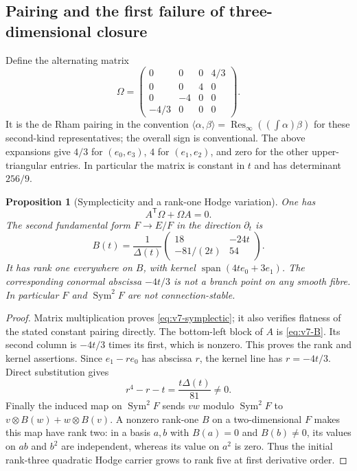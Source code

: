 \documentclass[11pt]{article}
\newtheorem{proposition}[proposition]{Proposition}
\theoremstyle{definition}
\theoremstyle{remark}
\newcommand{\Span}{\operatorname{span}}
\begin{document}
\subsection{Pairing and the first failure of three-dimensional closure}
Define the alternating matrix
\begin{equation}
 \Omega=
 \begin{pmatrix}
 0&0&0&4/3\\
 0&0&4&0\\
 0&-4&0&0\\
 -4/3&0&0&0
 \end{pmatrix}.
 \label{eq:v7-Omega}
\end{equation}
It is the de Rham pairing in the convention
$\langle\alpha,\beta\rangle=\operatorname{Res}_\infty((\int\alpha)\beta)$
for these second-kind representatives; the overall sign is conventional.
The above expansions give $4/3$ for $(e_0,e_3)$, $4$ for $(e_1,e_2)$,
and zero for the other upper-triangular entries. In particular the matrix
is constant in $t$ and has determinant $256/9$.

\begin{proposition}[Symplecticity and a rank-one Hodge variation]
\label{prop:v7-Higgs}
One has
\begin{equation}
 \boxed{A^{\mathsf T}\Omega+\Omega A=0.}
 \label{eq:v7-symplectic}
\end{equation}
The second fundamental form $F\to E/F$ in the direction $\partial_t$ is
\begin{equation}
 \boxed{B(t)=\frac1{\Delta(t)}
 \begin{pmatrix}18&-24t\\-81/(2t)&54\end{pmatrix}.}
 \label{eq:v7-B}
\end{equation}
It has rank one everywhere on $B$, with kernel
$\Span(4t e_0+3e_1)$. The corresponding conormal abscissa $-4t/3$ is not a
branch point on any smooth fibre. In particular $F$ and
$\operatorname{Sym}^2F$ are not connection-stable.
\end{proposition}
\begin{proof}
Matrix multiplication proves \eqref{eq:v7-symplectic}; it also verifies
flatness of the stated constant pairing directly. The bottom-left block of
$A$ is \eqref{eq:v7-B}. Its second column is $-4t/3$ times its first,
which is nonzero. This proves the rank and kernel assertions.
Since $e_1-r e_0$ has abscissa $r$, the kernel line has
$r=-4t/3$. Direct substitution gives
\[
 r^4-r-t=\frac{t\Delta(t)}{81}\ne0.
\]
Finally the induced map on $\operatorname{Sym}^2F$ sends $vw$ modulo
$\operatorname{Sym}^2F$ to $v\otimes B(w)+w\otimes B(v)$. A nonzero
rank-one $B$ on a two-dimensional $F$ makes this map have rank two: in a
basis $a,b$ with $B(a)=0$ and $B(b)\ne0$, its values on $ab$ and $b^2$
are independent, whereas its value on $a^2$ is zero. Thus the initial rank-three
quadratic Hodge carrier grows to rank five at first derivative order.
\end{proof}
\end{document}
